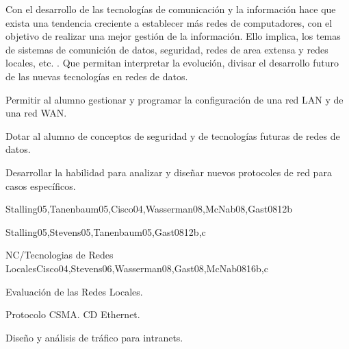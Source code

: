 \begin{syllabus}


\begin{justification}
   Con el desarrollo de las tecnologías de comunicación   y la información
    hace que exista una tendencia creciente a  establecer  más redes de
    computadores,  con el objetivo de realizar una mejor gestión de la
    información.  Ello implica, los temas de sistemas de comunición de  datos,
     seguridad, redes de area extensa  y redes  locales, etc.  . Que permitan
     interpretar la  evolución, divisar  el desarrollo  futuro de las
     nuevas  tecnologías en redes de datos.
   \end{justification}
   
   \begin{goals}
   \item Permitir al alumno gestionar y programar la configuración de una red LAN y de una red WAN.
   \item Dotar al alumno de conceptos de seguridad y de tecnologías futuras de redes de datos.
   \item Desarrollar la habilidad para analizar y diseñar nuevos protocoles de red para casos específicos.
   \end{goals}
   
   
   
   \begin{unit}{\NCIntroduction}{}{Stalling05,Tanenbaum05,Cisco04,Wasserman08,McNab08,Gast08}{12}{b}
      \NCIntroductionAllTopics
      \NCIntroductionAllLearningOutcomes
   \end{unit}
   
   \begin{unit}{\NCNetworkedApplications}{}{Stalling05,Stevens05,Tanenbaum05,Gast08}{12}{b,c}
      \NCNetworkedApplicationsAllTopics
      \NCNetworkedApplicationsAllLearningOutcomes
   \end{unit}
   
   \begin{unit}{NC/Tecnologias de Redes Locales}{}{Cisco04,Stevens06,Wasserman08,Gast08,McNab08}{16}{b,c}
      \begin{topics}
         \item Evaluación de las  Redes  Locales.
         \item Protocolo CSMA. CD Ethernet.
         \item Diseño y  análisis de  tráfico para intranets.
      \end{topics}
   

\end{unit}
\end{syllabus}
